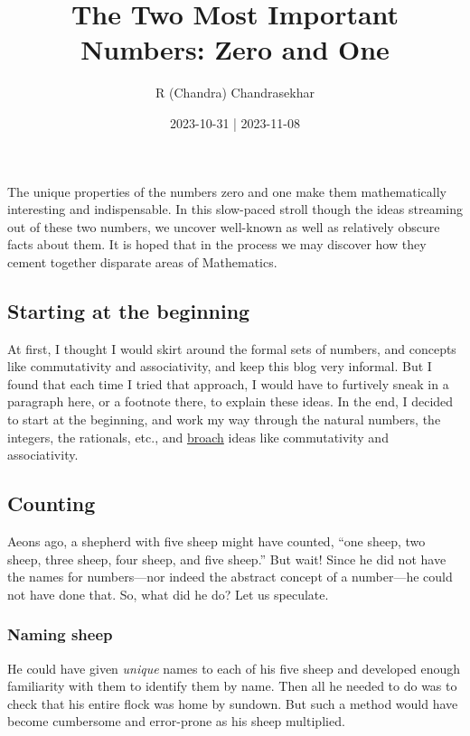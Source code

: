 \documentclass[
  a4paper,
]{article}
\title{The Two Most Important Numbers: Zero and One}
\author{R (Chandra) Chandrasekhar}
\date{2023-10-31 | 2023-11-08}
\begin{document}
\maketitle

\thispagestyle{empty}


The unique properties of the numbers zero and one make them
mathematically interesting and indispensable. In this slow-paced stroll
though the ideas streaming out of these two numbers, we uncover
well-known as well as relatively obscure facts about them. It is hoped
that in the process we may discover how they cement together disparate
areas of Mathematics.

\subsection{Starting at the beginning}\label{starting-at-the-beginning}

At first, I thought I would skirt around the formal sets of numbers, and
concepts like commutativity and associativity, and keep this blog very
informal. But I found that each time I tried that approach, I would have
to furtively sneak in a paragraph here, or a footnote there, to explain
these ideas. In the end, I decided to start at the beginning, and work
my way through the natural numbers, the integers, the rationals, etc.,
and \href{https://www.thefreedictionary.com/broach}{broach} ideas like
commutativity and associativity.

\subsection{Counting}\label{counting}

Aeons ago, a shepherd with five sheep might have counted, ``one sheep,
two sheep, three sheep, four sheep, and five sheep.'' But wait! Since he
did not have the names for numbers---nor indeed the abstract concept of
a number---he could not have done that. So, what did he do? Let us
speculate.

\subsubsection{Naming sheep}\label{naming-sheep}

He could have given \emph{unique} names to each of his five sheep and
developed enough familiarity with them to identify them by name. Then
all he needed to do was to check that his entire flock was home by
sundown. But such a method would have become cumbersome and error-prone
as his sheep multiplied.
\end{document}
